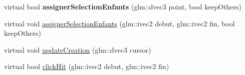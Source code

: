 \begin{DoxyCompactItemize}
\item 
\hypertarget{group__inf2990_ga4214cc2ab8bb23ab67c10387d7d1ef5e}{}virtual bool {\bfseries assigner\+Selection\+Enfants} (glm\+::dvec3 point, bool keep\+Others)\label{group__inf2990_ga4214cc2ab8bb23ab67c10387d7d1ef5e}

\item 
virtual void \hyperlink{group__inf2990_ga7304995555625461f49b1e75dd81e888}{assigner\+Selection\+Enfants} (glm\+::ivec2 debut, glm\+::ivec2 fin, bool keep\+Others)
\item 
virtual void \hyperlink{group__inf2990_ga233fd4600812176c557bb94ea04da5c9}{update\+Creation} (glm\+::dvec3 cursor)
\end{DoxyCompactItemize}
{\bf }\par
\begin{DoxyCompactItemize}
\item 
virtual bool \hyperlink{group__inf2990_gad1d1a9c6adcedfcd5eda6c6d4e67a50f}{click\+Hit} (glm\+::ivec2 debut, glm\+::ivec2 fin)
\end{DoxyCompactItemize}

